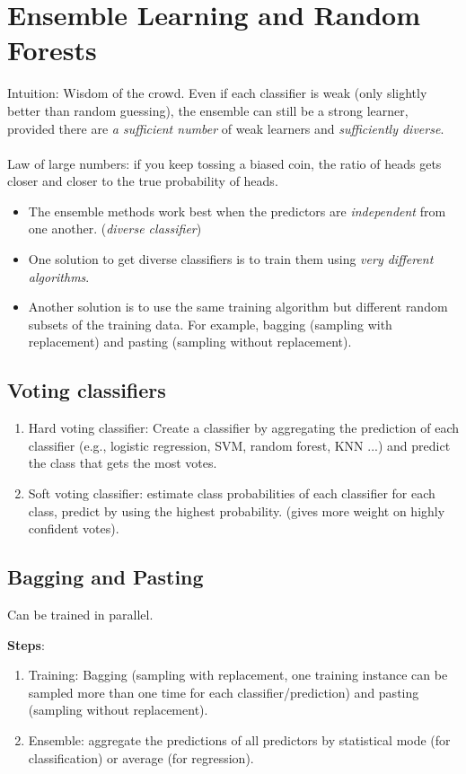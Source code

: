 \documentclass[12pt,oneside,a4paper]{article}
\numberwithin{equation}{section}
\begin{document}
\section{Ensemble Learning and Random Forests}

Intuition: Wisdom of the crowd. Even if each classifier is weak (only slightly better than random guessing), the ensemble can still be a strong learner, provided there are \emph{a sufficient number} of weak learners and \emph{sufficiently diverse}.\\~\\
Law of large numbers: if you keep tossing a biased coin, the ratio of heads gets closer and closer to the true probability of heads.

 \begin{itemize}
 	\item The ensemble methods work best when the predictors are \emph{independent} from one another. (\emph{diverse classifier})
 	
 	\item One solution to get diverse classifiers is to train them using \emph{very different algorithms}.
 	
 	\item Another solution is to use the same training algorithm but different random subsets of the training data. For example, bagging (sampling with replacement) and pasting (sampling without replacement).
 \end{itemize}
\subsection{Voting classifiers}
\begin{enumerate}
\item Hard voting classifier: Create a classifier by aggregating the prediction of each classifier (e.g., logistic regression, SVM, random forest, KNN ...) and predict the class that gets the most votes.


\item Soft voting classifier: estimate class probabilities of each classifier for each class, predict by using the highest probability. (gives more weight on highly confident votes).
\end{enumerate}
\subsection{Bagging and Pasting}
Can be trained in parallel.

\textbf{Steps}:
\begin{enumerate}
\item Training: Bagging (sampling with replacement, one training instance can be sampled more than one time for each classifier/prediction) and pasting (sampling without replacement).
\item Ensemble: aggregate the predictions of all predictors by statistical mode (for classification) or average (for regression).
\end{enumerate}
\end{document}
